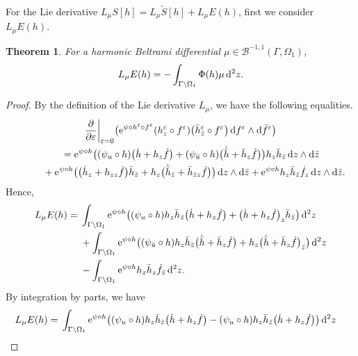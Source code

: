 \documentclass[10pt,a4paper]{amsart}
\numberwithin{equation}{section}
\newtheorem{Theorem}{Theorem}[section]
\newcommand{\vep}{\varepsilon}
\begin{document}
For the Lie derivative $L_\mu S[h]=L_\mu \check{S}[h]+ L_\mu E(h)$, first we consider $L_\mu E(h)$.

\begin{Theorem}\label{t:E-variation}
For a harmonic Beltrami differential $\mu\in \mathcal{B}^{-1,1}(\Gamma,\Omega_1)$,
\begin{gather*}
L_{\mu} E(h) =- \int_{\Gamma\backslash \Omega_1} \Phi(h) \mu\, {\rm d}^2z.
\end{gather*}
\end{Theorem}

\begin{proof}
By the definition of the Lie derivative $L_{\mu}$, we have the following equalities.
\begin{gather*}
\frac{\partial}{\partial\vep} \bigg|_{\vep=0} \big({\rm e}^{\psi\circ h^\vep\circ f^\vep} (h^\vep_z\circ f^\vep) \big( \bar{h}^\vep_{\bar{z}}\circ f^\vep \big) \, {\rm d}f^\vep\wedge {\rm d}\bar{f}^\vep \big)
\\ \qquad
{}= {\rm e}^{\psi\circ h} \big((\psi_u\circ h) \big(\dot{h}+h_z \dot{f} \big) +(\psi_{\bar{u}}\circ h) \big(\dot{\bar{h}} +\bar{h}_z \dot{f} \big)\big)h_z \bar{h}_{\bar{z}}\, {\rm d}z\wedge {\rm d}\bar{z}
\\ \qquad \phantom{=}
{}+ {\rm e}^{\psi\circ h} \big( \big(\dot{h}_z +h_{zz} \dot{f}\big) \bar{h}_{\bar{z}} + h_z \big(\dot{\bar{h}}_{\bar{z}} +\bar{h}_{\bar{z}z} \dot{f}\big)\big)\, {\rm d}z\wedge {\rm d}\bar{z}
+ {\rm e}^{\psi\circ h} h_z \bar{h}_{\bar{z}} \dot{f}_z \, {\rm d}z\wedge {\rm d}\bar{z}.
\end{gather*}
Hence,
\begin{align*}
L_\mu E(h) ={}& \int_ {\Gamma\backslash \Omega_1} {\rm e}^{\psi\circ h} \big((\psi_u\circ h) h_z \bar{h}_{\bar{z}}\big(\dot{h}+h_z \dot{f} \big) +\big(\dot{h} +h_{z} \dot{f}\big)_z \bar{h}_{\bar{z}} \big)\, {\rm d}^2z
\\
&+ \int_{\Gamma\backslash \Omega_1} {\rm e}^{\psi\circ h} \big((\psi_{\bar{u}}\circ h) h_z \bar{h}_{\bar{z}}\big(\dot{\bar{h}}+\bar{h}_z \dot{f} \big) +h_z\big(\dot{\bar{h}} +\bar{h}_{z} \dot{f}\big)_{\bar{z}} \big)\, {\rm d}^2z
\\
&-\int_{\Gamma\backslash \Omega_1} {\rm e}^{\psi\circ h} h_z \bar{h}_{{z}} \dot{f}_{\bar{z}} \, {\rm d}^2z.
\end{align*}
By integration by parts, we have
\begin{align*}
L_\mu E(h)={}& \int_{\Gamma\backslash \Omega_1} {\rm e}^{\psi\circ h} \big( (\psi_u\circ h)h_z \bar{h}_{\bar{z}} \big(\dot{h}+h_z \dot{f} \big) -(\psi_u\circ h)h_z \bar{h}_{\bar{z}} \big(\dot{h}+h_z \dot{f} \big) \big)\, {\rm d}^2z

\end{align*}
\end{proof}
\end{document}
